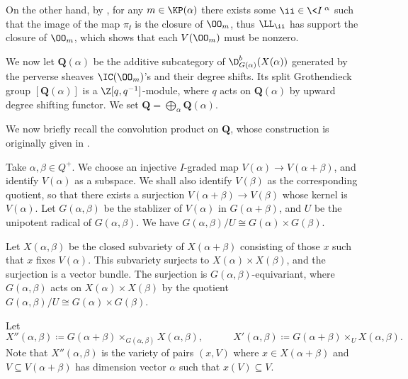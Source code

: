 On the other hand, by \cite[Theorem 2.2]{Re},
for any $m\in\KP(\alpha)$ there exists some $\ii\in\<I\>^\alpha$
such that the image of the map $\pi_{\ii}$ is
the closure of $\OO_m$, thus $\LL_{\ii}$ has support
the closure of $\OO_m$, which shows that each $V(\OO_m)$ must be nonzero.

We now let $\mathbf{Q}(\alpha)$ be the additive subcategory
of $\D_{G(\alpha)}^b(X(\alpha))$ generated by the perverse sheaves
$\IC(\OO_m)$'s and their degree shifts. Its split Grothendieck group
$[\mathbf{Q}(\alpha)]$ is a $\Z[q,q^{-1}]$-module,
where $q$ acts on $\mathbf{Q}(\alpha)$ by upward degree shifting functor.
We set $\mathbf{Q} = \bigoplus_\alpha\mathbf{Q}(\alpha)$.

We now briefly recall the convolution product on $\mathbf{Q}$,
whose construction is originally given in \cite{L}.

Take $\alpha,\beta\in Q^+$. We choose an injective $I$-graded map
$V(\alpha)\to V(\alpha+\beta)$, and identify $V(\alpha)$ as a subspace.
We shall also identify $V(\beta)$ as the corresponding quotient,
so that there exists a surjection $V(\alpha+\beta)\to V(\beta)$
whose kernel is $V(\alpha)$. Let $G(\alpha,\beta)$
be the stablizer of $V(\alpha)$ in $G(\alpha+\beta)$, and $U$ be
the unipotent radical of $G(\alpha,\beta)$. We have $G(\alpha,\beta)/U\cong G(\alpha)\times G(\beta)$.

Let $X(\alpha,\beta)$ be the closed subvariety of $X(\alpha+\beta)$ consisting of 
those $x$ such that $x$ fixes $V(\alpha)$. This subvariety
surjects to $X(\alpha)\times X(\beta)$, and the surjection
is a vector bundle. The surjection is $G(\alpha,\beta)$-equivariant, 
where $G(\alpha,\beta)$ acts on $X(\alpha)\times X(\beta)$
by the quotient $G(\alpha,\beta)/U\cong G(\alpha)\times G(\beta)$.

Let 
\[
    X''(\alpha,\beta) \coloneq  G(\alpha+\beta)\times_{G(\alpha,\beta)}X(\alpha,\beta),
    \hspace{3em}X'(\alpha,\beta) \coloneq  G(\alpha+\beta)\times_{U}X(\alpha,\beta).
\]    
Note that $X''(\alpha,\beta)$ is the variety of pairs $(x,V)$
where $x\in X(\alpha+\beta)$ and $V\subseteq V(\alpha+\beta)$
has dimension vector $\alpha$ such that $x(V)\subseteq V$.

